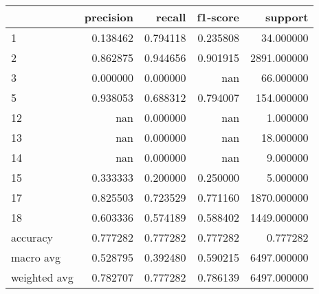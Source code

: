 \begin{tabular}{lrrrr}
\toprule
 & precision & recall & f1-score & support \\
\midrule
1 & 0.138462 & 0.794118 & 0.235808 & 34.000000 \\
2 & 0.862875 & 0.944656 & 0.901915 & 2891.000000 \\
3 & 0.000000 & 0.000000 & nan & 66.000000 \\
5 & 0.938053 & 0.688312 & 0.794007 & 154.000000 \\
12 & nan & 0.000000 & nan & 1.000000 \\
13 & nan & 0.000000 & nan & 18.000000 \\
14 & nan & 0.000000 & nan & 9.000000 \\
15 & 0.333333 & 0.200000 & 0.250000 & 5.000000 \\
17 & 0.825503 & 0.723529 & 0.771160 & 1870.000000 \\
18 & 0.603336 & 0.574189 & 0.588402 & 1449.000000 \\
accuracy & 0.777282 & 0.777282 & 0.777282 & 0.777282 \\
macro avg & 0.528795 & 0.392480 & 0.590215 & 6497.000000 \\
weighted avg & 0.782707 & 0.777282 & 0.786139 & 6497.000000 \\
\bottomrule
\end{tabular}
